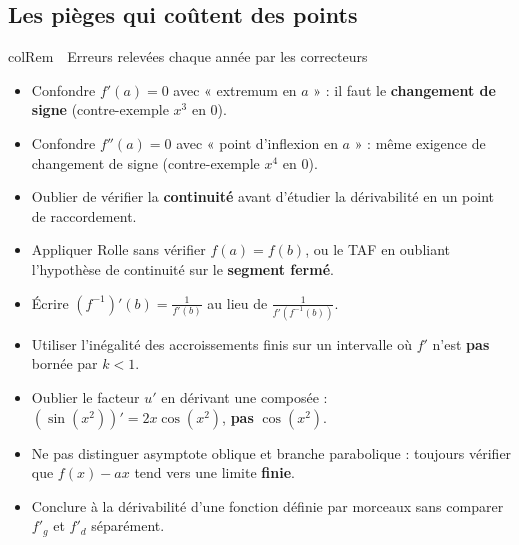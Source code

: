\documentclass[11pt,a4paper]{article}
\newenvironment{remarque}[1][Remarque]
  {\begin{fiche}{colRem}{\ding{43}~~#1}}{\end{fiche}}
\begin{document}
\subsection{Les pièges qui coûtent des points}

\begin{remarque}[Erreurs relevées chaque année par les correcteurs]
\begin{itemize}[leftmargin=6mm, itemsep=0.5mm]
  \item Confondre $f'(a) = 0$ avec « extremum en $a$ » : il faut le \textbf{changement de signe} (contre-exemple $x^3$ en $0$).
  \item Confondre $f''(a) = 0$ avec « point d'inflexion en $a$ » : même exigence de changement de signe (contre-exemple $x^4$ en $0$).
  \item Oublier de vérifier la \textbf{continuité} avant d'étudier la dérivabilité en un point de raccordement.
  \item Appliquer Rolle sans vérifier $f(a) = f(b)$, ou le TAF en oubliant l'hypothèse de continuité sur le \textbf{segment fermé}.
  \item Écrire $(f^{-1})'(b) = \frac{1}{f'(b)}$ au lieu de $\frac{1}{f'(f^{-1}(b))}$.
  \item Utiliser l'inégalité des accroissements finis sur un intervalle où $f'$ n'est \textbf{pas} bornée par $k < 1$.
  \item Oublier le facteur $u'$ en dérivant une composée : $(\sin(x^2))' = 2x\cos(x^2)$, \textbf{pas} $\cos(x^2)$.
  \item Ne pas distinguer asymptote oblique et branche parabolique : toujours vérifier que $f(x) - ax$ tend vers une limite \textbf{finie}.
  \item Conclure à la dérivabilité d'une fonction définie par morceaux sans comparer $f'_g$ et $f'_d$ séparément.
\end{itemize}
\end{remarque}
\end{document}
